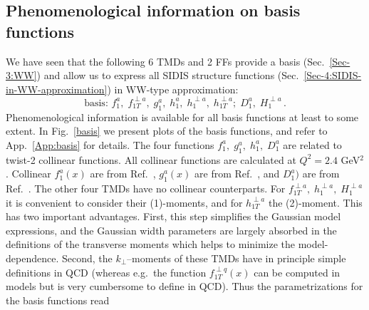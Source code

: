 \documentclass[a4paper,11pt]{article}
\newcommand{\blue}[1]{{\color{blue} #1}}
\newcommand{\be}{\begin{equation}}
\newcommand{\ee}{\end{equation}}
\newcommand{\ps}[1]{\blue{ #1}}
\begin{document}
\subsection{Phenomenological information on basis functions}
\label{Sec-4.3:plot-basis-functions}

We have seen that the following 6 TMDs and 2 FFs provide a basis 
(Sec.~\ref{Sec-3:WW}) and allow us to express all SIDIS structure 
functions (Sec.~\ref{Sec-4:SIDIS-in-WW-approximation})  
in WW-type approximation: 
\be\label{Eq:basis}
   \mbox{basis: \ \ } 
   f_1^a, \; f_{1T}^{\perp a}, \; g_1^a, \; h_1^a, \;h_1^{\perp a},\; h_{1T}^{\perp a};
   \; D_1^a, \; H_1^{\perp a} \, .
\ee
Phenomenological information is available for all basis functions at 
least to some extent. 
In Fig.~\ref{basis} we present plots of the basis functions, and refer
to App.~\ref{App:basis} for details.
The four functions $f_1^a, \; g_1^a, \; h_1^a,\; D_1^a$  are related to 
twist-2 collinear functions. All collinear functions are calculated at 
$Q^2 = 2.4$ GeV$^2$. Collinear $f_1^a(x)$ are from Ref.~\cite{Martin:2009iq},  
$g_1^a(x)$ are from Ref.~\cite{Gluck:1998xa}, and $D_1^a)$ are from 
Ref.~\cite{deFlorian:2007aj}. The other four TMDs 
\ps{have no collinear counterparts. 
For $f_{1T}^{\perp a},\;h_1^{\perp a},\;H_1^{\perp a}$ it is convenient to 
consider their (1)-moments, and for $ h_{1T}^{\perp a}$  the (2)-moment.
This has two important advantages. First, this step simplifies 
the Gaussian model expressions, and the Gaussian width parameters are
largely absorbed in the definitions of the transverse moments which 
helps to minimize the model-dependence. Second,
the $k_\perp$--moments of these TMDs have in principle simple definitions
in QCD (whereas e.g.\ the function $f_{1T}^{\perp q}(x)$ can be computed in
models but is very cumbersome to define in QCD).
Thus the parametrizations for the basis functions read}
\end{document}
